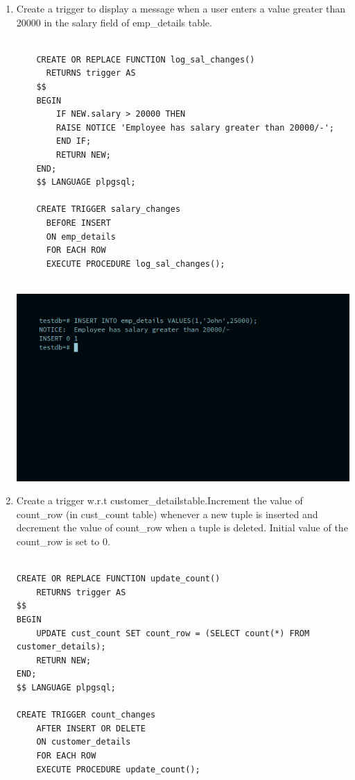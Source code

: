 \documentclass[10pt,a4paper,titlepage]{report}
\begin{document}
{\begin{enumerate}
	\item Create a trigger to display a message when a user enters a value greater than 20000 in the salary field of emp\_details table.
	\begin{verbatim}

	CREATE OR REPLACE FUNCTION log_sal_changes()
	  RETURNS trigger AS
	$$
	BEGIN
		IF NEW.salary > 20000 THEN
	  	RAISE NOTICE 'Employee has salary greater than 20000/-';
		END IF;
		RETURN NEW;
	END;
	$$ LANGUAGE plpgsql;

	CREATE TRIGGER salary_changes
	  BEFORE INSERT
	  ON emp_details
	  FOR EACH ROW
	  EXECUTE PROCEDURE log_sal_changes();


	\end{verbatim}
	\includegraphics[width=\linewidth]{../Images/Triggers/2.png}

	\item Create a trigger w.r.t customer\_detailstable.Increment the value of count\_row (in cust\_count table) whenever a new tuple is inserted and decrement the value of count\_row when a tuple is deleted. Initial value of the count\_row is set to 0.
	\begin{verbatim}
	
CREATE OR REPLACE FUNCTION update_count()
	RETURNS trigger AS
$$
BEGIN
	UPDATE cust_count SET count_row = (SELECT count(*) FROM customer_details);
	RETURN NEW;
END;
$$ LANGUAGE plpgsql;

CREATE TRIGGER count_changes
	AFTER INSERT OR DELETE
	ON customer_details
	FOR EACH ROW
	EXECUTE PROCEDURE update_count();


\end{verbatim}
\end{enumerate}}
\end{document}

